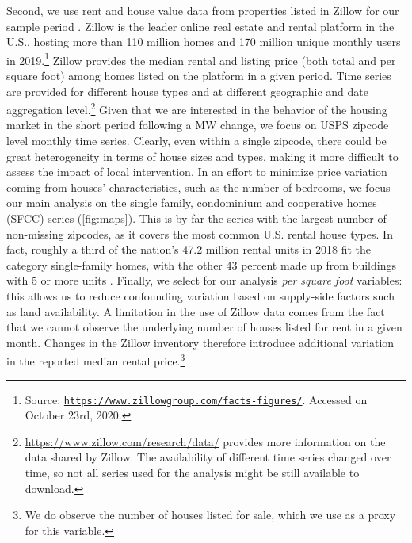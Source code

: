 Second, we use rent and house value data from properties listed in Zillow for our sample period 
\parencite{zillow}. Zillow is the leader online real estate and rental platform in the U.S., 
hosting more than 110 million homes and 170 million unique monthly users in 2019.\footnote{
	Source: \href{https://www.zillowgroup.com/facts-figures/}
	{\texttt{https://www.zillowgroup.com/facts-figures/}}. Accessed on October 23rd, 2020.}
Zillow provides the median rental and listing price (both total and per square foot) among homes 
listed on the platform in a given period. Time series are provided for different 
house types and at different geographic and date aggregation level.\footnote{
	\href{https://www.zillow.com/research/data/}{https://www.zillow.com/research/data/} 
	provides more information on the data shared by Zillow. The availability of different time 
	series changed over time, so not all series used for the analysis might be still available 
	to download.}
Given that we are interested in the behavior of the housing market in the short period following a 
MW change, we focus on USPS zipcode level monthly time series. Clearly, even within a single 
zipcode, there could be great heterogeneity in terms of house sizes and types, making it more 
difficult to assess the impact of local intervention. In an effort to minimize price variation 
coming from houses' characteristics, such as the number of bedrooms, we focus our main analysis 
on the single family, condominium and cooperative homes (SFCC) series (\autoref{fig:maps}). This is 
by far the series with the largest number of non-missing zipcodes, as it covers the most common 
U.S. rental house types. In fact, roughly a third of the nation's 47.2 million rental units in 2018 fit the 
category single-family homes, with the other 43 percent made up from buildings with 5 or more units 
\parencite{JCHS2020}. Finally, we select for our analysis \textit{per square foot} variables: 
this allows us to reduce confounding variation based on supply-side factors such as land 
availability. A limitation in the use of Zillow data comes from the fact that we cannot observe the 
underlying number of houses listed for rent in a given month. Changes in the Zillow inventory 
therefore introduce additional variation in the reported median rental price.\footnote{We do
	observe the number of houses listed for sale, which we use as a proxy for this variable.}

